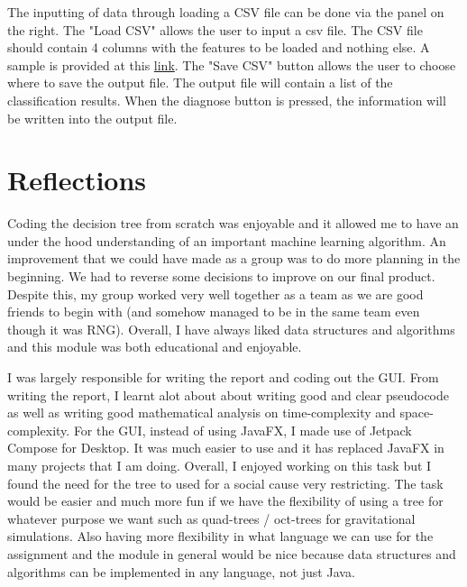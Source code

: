 The inputting of data through loading a CSV file can be done via the panel on the right. The "Load CSV" allows the user to input a csv file. The CSV file should contain 4 columns with the features to be loaded and nothing else. A sample is provided at this \href{https://nushighedu-my.sharepoint.com/:x:/g/personal/h1810084_nushigh_edu_sg/ERyyrju9vEJJoOo8wW9L8mYB2RaX_GNevY3PBxZBZaeQCw?e=eewdHe}{link}. The "Save CSV" button allows the user to choose where to save the output file. The output file will contain a list of the classification results. When the diagnose button is pressed, the information will be written into the output file.

\section{Reflections}
 Coding the decision tree from scratch was enjoyable and it allowed me to have an under the hood understanding of an important machine learning algorithm. An improvement that we could have made as a group was to do more planning in the beginning. We had to reverse some decisions to improve on our final product. Despite this, my group worked very well together as a team as we are good friends to begin with (and somehow managed to be in the same team even though it was RNG). Overall, I have always liked data structures and algorithms and this module was both educational and enjoyable.

 I was largely responsible for writing the report and coding out the GUI. From writing the report, I learnt alot about about writing good and clear pseudocode as well as writing good mathematical analysis on time-complexity and space-complexity. For the GUI, instead of using JavaFX, I made use of Jetpack Compose for Desktop. It was much easier to use and it has replaced JavaFX in many projects that I am doing. Overall, I enjoyed working on this task but I found the need for the tree to used for a social cause very restricting. The task would be easier and much more fun if we have the flexibility of using a tree for whatever purpose we want such as quad-trees / oct-trees for gravitational simulations. Also having more flexibility in what language we can use for the assignment and the module in general would be nice because data structures and algorithms can be implemented in any language, not just Java.





